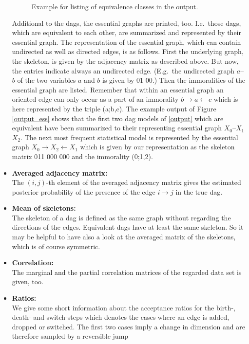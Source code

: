 \begin{itemize}
\begin{figure}
{}
{\em\caption{\label{output_ess} Example for listing of equivalence
classes in the output.}}
\end{figure}
Additional to the dags, the essential graphs are printed, too.
I.e.~those dags, which are equivalent to each other, are
summarized and represented by their essential graph. The
representation of the essential graph, which can contain
undirected as well as directed edges, is as follows. First the
underlying graph, the skeleton, is given by the adjacency matrix
as described above. But now, the entries indicate always an
undirected edge. (E.g.~the undirected graph $a$--$b$ of the two
variables $a$ and $b$ is given by 01 00.) Then the immoralities of
the essential graph are listed. Remember that within an essential
graph an oriented edge can only occur as a part of an immorality
$b \rightarrow a \leftarrow c$ which is here represented by the
triple (a;b,c). The example output of Figure \autoref{output_ess}
shows that the first two dag models of \autoref{output} which are
equivalent have been summarized to their representing essential
graph $X_0$--$X_1$ $X_2$. The next most frequent statistical model
is represented by the essential graph $X_0 \rightarrow X_2
\leftarrow X_1$ which is given by our representation as the
skeleton matrix 011 000 000 and the immorality (0;1,2).
%
%
\item {\bf Averaged adjacency matrix:}\\
The $(i,j)$-th element of the averaged adjacency matrix gives the
estimated posterior probability of the presence of the edge $i
\rightarrow j$ in the true dag.
\item {\bf Mean of skeletons:}\\
The skeleton of a dag is defined as the same graph without
regarding the directions of the edges. Equivalent dags have at
least the same skeleton. So it may be helpful to have also a look
at the averaged matrix of the skeletons, which is of course
symmetric.
\item {\bf Correlation:}\\
The marginal and the partial correlation matrices of the regarded
data set is given, too.
\item {\bf Ratios:}\\
We give some short information about the acceptance ratios for the
birth-, death- and switch-steps which denotes the cases where an
edge is added, dropped or switched. The first two cases imply a
change in dimension and are therefore sampled by a reversible jump

\end{itemize}
